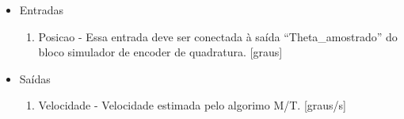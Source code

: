         \begin{itemize}

            \item Entradas
                \begin{enumerate}
                    \item Posicao - Essa entrada deve ser conectada à saída ``Theta\_amostrado'' do bloco simulador de encoder de quadratura. [graus]
                \end{enumerate}
            \item Saídas
                \begin{enumerate}
                    \item Velocidade - Velocidade estimada pelo algorimo M/T. [graus/s]
                \end{enumerate}
        \end{itemize}









